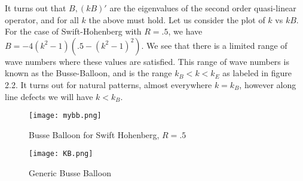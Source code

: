 \documentclass[12pt]{article}
\numberwithin{equation}{section}
\begin{document}
It turns out that $B, (kB)'$ are the eigenvalues of the second order quasi-linear operator, and for all $k$ the above must hold. Let us consider the plot of $k$ vs $kB$. For the case of Swift-Hohenberg with $R=.5$, we have $B = -4(k^2-1)(.5-(k^2-1)^2)$. We see that there is a limited range of wave numbers where these values are satisfied. This range of wave numbers is known as the Busse-Balloon, and is the range $k_B<k<k_E$ as labeled in figure 2.2. It turns out for natural patterns, almost everywhere $k=k_B$, however along line defects we will have $k<k_B$.  
\begin{figure}
\centering
\texttt{[image: mybb.png]}
\caption{Busse Balloon for Swift Hohenberg, $R=.5$}
\end{figure}
\begin{figure}
\centering
\texttt{[image: KB.png]}
\caption{Generic Busse Balloon}
\end{figure}
\end{document}
